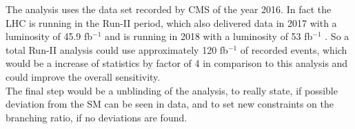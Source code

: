 The analysis uses the data set recorded by \gls{CMS} of the year 2016. In fact the \gls{LHC} is running in the Run-II period, which also delivered data in 2017 with a luminosity of 45.9 fb$^{-1}$ and is running in 2018 with a luminosity of 53 fb$^{-1}$ \cite{CMSLUMI1718}. So a total Run-II analysis could use approximately 120 fb$^{-1}$ of recorded events, which would be a increase of statistics by factor of 4 in comparison to this analysis and could improve the overall sensitivity. \\

The final step would be a unblinding of the analysis, to really state, if possible deviation from the \gls{SM} can be seen in data, and to set new constraints on the branching ratio, if no deviations are found. 



 



  




